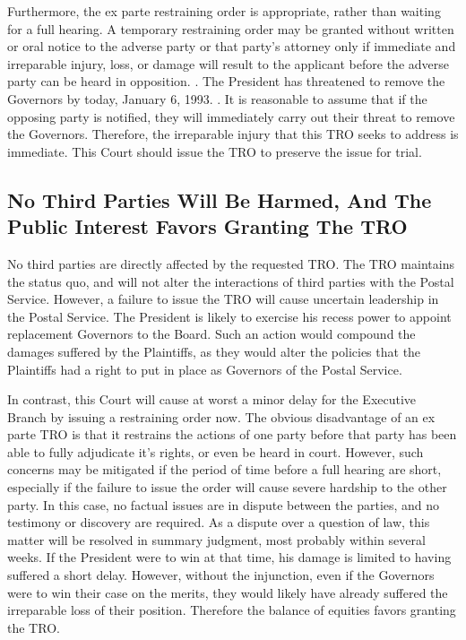 \documentclass[12pt,\documentclassflag]{lawbrief}
\begin{document}
Furthermore, the ex parte restraining order is appropriate, rather than waiting for a full hearing. A temporary restraining order may be granted without written or oral notice to the adverse party or that party's attorney only if immediate and irreparable injury, loss, or damage will result to the applicant before the adverse party can be heard in opposition. \See {}.  The President has threatened to remove the Governors by today, January 6, 1993.  \See {}. It is reasonable to assume that if the opposing party is notified, they will immediately carry out their threat to remove the Governors.  Therefore, the irreparable injury that this TRO seeks to address is immediate.  This Court should issue the TRO to preserve the issue for trial. 
 
\subsection{No Third Parties Will Be Harmed, And The Public Interest Favors Granting The TRO}

No third parties are directly affected by the requested TRO.  The TRO maintains the status quo, and will not alter the interactions of third parties with the Postal Service.  However, a failure to issue the TRO will cause uncertain leadership in the Postal Service.  The President is likely to exercise his recess power to appoint replacement Governors to the Board.  Such an action would compound the damages suffered by the Plaintiffs, as they would alter the policies that the Plaintiffs had a right to put in place as Governors of the Postal Service.   

In contrast, this Court will cause at worst a minor delay for the Executive Branch by issuing a restraining order now.  The obvious disadvantage of an ex parte TRO is that it restrains the actions of one party before that party has been able to fully adjudicate it's rights, or even be heard in court.  However, such concerns may be mitigated if the period of time before a full hearing are short, especially if the failure to issue the order will cause severe hardship to the other party.  In this case, no factual issues are in dispute between the parties, and no testimony or discovery are required.  As a dispute over a question of law, this matter will be resolved in summary judgment, most probably within several weeks.  If the President were to win at that time, his damage is limited to having suffered a short delay.  However, without the injunction, even if the Governors were to win their case on the merits, they would likely have already suffered the irreparable loss of their position.  Therefore the balance of equities favors granting the TRO.
\end{document}
